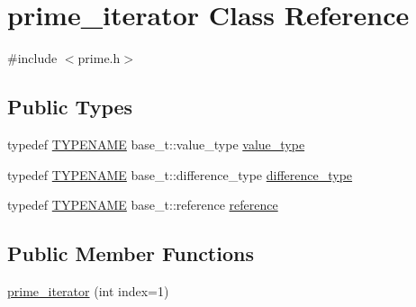 \hypertarget{classyuh_1_1range__detail_1_1prime__iterator}{\section{prime\-\_\-iterator \-Class \-Reference}
\label{d9/dc8/classyuh_1_1range__detail_1_1prime__iterator}
}


{\ttfamily \#include $<$prime.\-h$>$}

\subsection*{\-Public \-Types}
\begin{DoxyCompactItemize}
\item 
typedef \hyperlink{prime_8h_a17f2e729a629eee9f5b7371c357f5e25}{\-T\-Y\-P\-E\-N\-A\-M\-E} base\-\_\-t\-::value\-\_\-type \hyperlink{classyuh_1_1range__detail_1_1prime__iterator_aaa801ea9fe09398ea8c5beb1324edadf}{value\-\_\-type}
\item 
typedef \hyperlink{prime_8h_a17f2e729a629eee9f5b7371c357f5e25}{\-T\-Y\-P\-E\-N\-A\-M\-E} \*
base\-\_\-t\-::difference\-\_\-type \hyperlink{classyuh_1_1range__detail_1_1prime__iterator_a18e7411e8bb12bf0d225a2ed55ce31c8}{difference\-\_\-type}
\item 
typedef \hyperlink{prime_8h_a17f2e729a629eee9f5b7371c357f5e25}{\-T\-Y\-P\-E\-N\-A\-M\-E} base\-\_\-t\-::reference \hyperlink{classyuh_1_1range__detail_1_1prime__iterator_ad1e39b66edf20cbb5c89ccb28ff834b6}{reference}
\end{DoxyCompactItemize}
\subsection*{\-Public \-Member \-Functions}
\begin{DoxyCompactItemize}
\item 
\hyperlink{classyuh_1_1range__detail_1_1prime__iterator_ac10bb4092341faec6bbf57f1a907c7e7}{prime\-\_\-iterator} (int index=1)
\end{DoxyCompactItemize}
